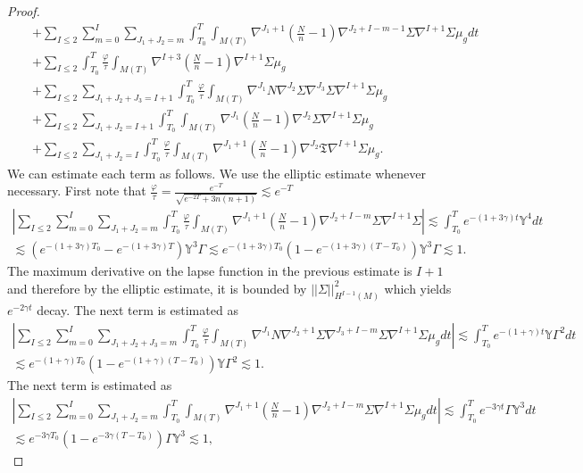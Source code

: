 \documentclass{amsart}
\begin{document}
\begin{proof}
\begin{align}
 &&+\sum_{I\leq 2}\sum_{m=0}^{I}\sum_{J_{1}+J_{2}=m}\int_{T_{0}}^{T}\int_{M(T)}\nabla^{J_{1}+1}(\frac{N}{n}-1)\nabla^{J_{2}+I-m-1}\Sigma\nabla^{I+1}\Sigma\mu_{g}dt\\\nonumber 
 &&+\sum_{I\leq 2}\int_{T_{0}}^{T}\frac{\varphi}{\tau}\int_{M(T)}\nabla^{I+3}(\frac{N}{n}-1)\nabla^{I+1}\Sigma\mu_{g}\\\nonumber 
&&+\sum_{I\leq 2}\sum_{J_{1}+J_{2}+J_{3}=I+1}\int_{T_{0}}^{T}\frac{\varphi}{\tau}\int_{M(T)}\nabla^{J_{1}}N\nabla^{J_{2}}\Sigma\nabla^{J_{3}}\Sigma\nabla^{I+1}\Sigma\mu_{g}\\\nonumber &&+\sum_{I\leq 2}\sum_{J_{1}+J_{2}=I+1}\int_{T_{0}}^{T}\int_{M(T)}\nabla^{J_{1}}(\frac{N}{n}-1)\nabla^{J_{2}}\Sigma\nabla^{I+1}\Sigma\mu_{g}\\\nonumber 
&&+\sum_{I\leq 2}\sum_{J_{1}+J_{2}=I}\int_{T_{0}}^{T}\frac{\varphi}{\tau}\int_{M(T)}\nabla^{J_{1}+1}(\frac{N}{n}-1)\nabla^{J_{2}}\mathfrak{T}\nabla^{I+1}\Sigma\mu_{g}.
\end{align}
We can estimate each term as follows. We use the elliptic estimate whenever necessary. First note that $\frac{\varphi}{\tau}=\frac{e^{-T}}{\sqrt{e^{-2T}+3n(n+1)}}\lesssim e^{-T}$ 
\begin{align}
| \sum_{I\leq 2}\sum_{m=0}^{I}\sum_{J_{1}+J_{2}=m}\int_{T_{0}}^{T}\frac{\varphi}{\tau}\int_{M(T)}\nonumber \nabla^{J_{1}+1}(\frac{N}{n}-1)\nabla^{J_{2}+I-m}\Sigma\nabla^{I+1}\Sigma |\lesssim \int_{T_{0}}^{T}e^{-(1+3\gamma)t}\mathds{Y}^{4}dt\\\nonumber \lesssim (e^{-(1+3\gamma)T_{0}}-e^{-(1+3\gamma)T})\mathds{Y}^{3}\Gamma\lesssim  e^{-(1+3\gamma)T_{0}}(1-e^{-(1+3\gamma)(T-T_{0})})\mathds{Y}^{3}\Gamma\lesssim 1. 
\end{align}
The maximum derivative on the lapse function in the previous estimate is $I+1$ and therefore by the elliptic estimate, it is bounded by $||\Sigma||^{2}_{H^{I-1}(M)}$ which yields $e^{-2\gamma t}$ decay. The next term is estimated as 
\begin{align}
 |\sum_{I\leq 2}\sum_{m=0}^{I}\sum_{J_{1}+J_{2}+J_{3}=m}\int_{T_{0}}^{T}\frac{\varphi}{\tau}\int_{M(T)}\nabla^{J_{1}}N\nabla^{J_{2}+1}\Sigma\nabla^{J_{3}+I-m}\Sigma\nonumber\nabla^{I+1}\Sigma\mu_{g}dt|\lesssim \int_{T_{0}}^{T}e^{-(1+\gamma)t}\mathds{Y}\Gamma^{2}dt\\\nonumber 
 \lesssim e^{-(1+\gamma)T_{0}}(1-e^{-(1+\gamma)(T-T_{0})})\mathds{Y}\Gamma^{2}\lesssim 1.
\end{align}
The next term is estimated as 
\begin{align}
|\sum_{I\leq 2}\sum_{m=0}^{I}\sum_{J_{1}+J_{2}=m}\int_{T_{0}}^{T}\int_{M(T)}\nabla^{J_{1}+1}(\frac{N}{n}-1)\nabla^{J_{2}+I-m}\Sigma\nabla^{I+1}\Sigma\mu_{g}dt|\lesssim \int_{T_{0}}^{T}e^{-3\gamma t} \Gamma\mathds{Y}^{3}dt\\\nonumber \lesssim e^{-3\gamma T_{0}}(1-e^{-3\gamma(T-T_{0})})\Gamma\mathds{Y}^{3}\lesssim 1, 

\end{align}
\end{proof}
\end{document}
